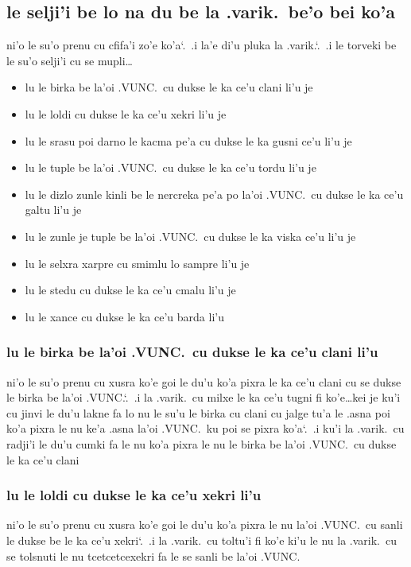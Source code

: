 \documentclass{report}
\newcommand\sds{\spacefactor\sfcode`.\ \space}
\begin{document}
\subsection{le selji'i be lo na du be la .varik.\ be'o bei ko'a}
ni'o le su'o prenu cu cfifa'i zo'e ko'a\sds  .i la'e di'u pluka la .varik.\sds  .i le torveki be le su'o selji'i cu se mupli\ldots
\begin{itemize}
	\item lu le birka be la'oi .VUNC.\ cu dukse le ka ce'u clani li'u je
	\item lu le loldi cu dukse le ka ce'u xekri li'u je
	\item lu le srasu poi darno le kacma pe'a cu dukse le ka gusni ce'u li'u je
	\item lu le tuple be la'oi .VUNC.\ cu dukse le ka ce'u tordu li'u je
	\item lu le dizlo zunle kinli be le nercreka pe'a po la'oi .VUNC.\ cu dukse le ka ce'u galtu li'u je
	\item lu le zunle je tuple be la'oi .VUNC.\ cu dukse le ka viska ce'u li'u je
	\item lu le selxra xarpre cu smimlu lo sampre li'u je
	\item lu le stedu cu dukse le ka ce'u cmalu li'u je
	\item lu le xance cu dukse le ka ce'u barda li'u
\end{itemize}

\subsubsection{lu le birka be la'oi .VUNC.\ cu dukse le ka ce'u clani li'u}
ni'o le su'o prenu cu xusra ko'e goi le du'u ko'a pixra le ka ce'u clani cu se dukse le birka be la'oi .VUNC.\sds  .i la .varik.\ cu milxe le ka ce'u tugni fi ko'e\ldots kei je ku'i cu jinvi le du'u lakne fa lo nu le su'u le birka cu clani cu jalge tu'a le .asna poi ko'a pixra le nu ke'a .asna la'oi .VUNC.\ ku poi se pixra ko'a\sds  .i ku'i la .varik.\ cu radji'i le du'u cumki fa le nu ko'a pixra le nu le birka be la'oi .VUNC.\ cu dukse le ka ce'u clani

\subsubsection{lu le loldi cu dukse le ka ce'u xekri li'u}
ni'o le su'o prenu cu xusra ko'e goi le du'u ko'a pixra le nu la'oi .VUNC.\ cu sanli le dukse be le ka ce'u xekri\sds  .i la .varik.\ cu toltu'i fi ko'e ki'u le nu la .varik.\ cu se tolsnuti le nu tcetcetcexekri fa le se sanli be la'oi .VUNC.
\end{document}
